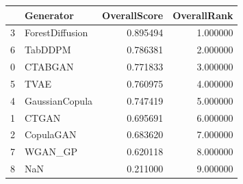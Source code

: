 \begin{tabular}{llrr}
\toprule
 & Generator & OverallScore & OverallRank \\
\midrule
3 & ForestDiffusion & 0.895494 & 1.000000 \\
6 & TabDDPM & 0.786381 & 2.000000 \\
0 & CTABGAN & 0.771833 & 3.000000 \\
5 & TVAE & 0.760975 & 4.000000 \\
4 & GaussianCopula & 0.747419 & 5.000000 \\
1 & CTGAN & 0.695691 & 6.000000 \\
2 & CopulaGAN & 0.683620 & 7.000000 \\
7 & WGAN_GP & 0.620118 & 8.000000 \\
8 & NaN & 0.211000 & 9.000000 \\
\bottomrule
\end{tabular}

